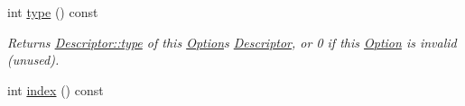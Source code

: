 \begin{DoxyCompactItemize}
\item 
int \hyperlink{classxmem_1_1config_1_1third__party_1_1_option_a4d80ee182577f0dacfbd617cfd714833}{type} () const 
\begin{DoxyCompactList}\small\item\em Returns \hyperlink{structxmem_1_1config_1_1third__party_1_1_descriptor_a4b9e9a5c9b08ef575ea4f603c54bff63}{Descriptor\+::type} of this \hyperlink{classxmem_1_1config_1_1third__party_1_1_option}{Option}\textquotesingle{}s \hyperlink{structxmem_1_1config_1_1third__party_1_1_descriptor}{Descriptor}, or 0 if this \hyperlink{classxmem_1_1config_1_1third__party_1_1_option}{Option} is invalid (unused). \end{DoxyCompactList}\item 
\hypertarget{classxmem_1_1config_1_1third__party_1_1_option_a7debc43bf253931503da7efd4bf478e9}{}int \hyperlink{classxmem_1_1config_1_1third__party_1_1_option_a7debc43bf253931503da7efd4bf478e9}{index} () const \label{classxmem_1_1config_1_1third__party_1_1_option_a7debc43bf253931503da7efd4bf478e9}


\end{DoxyCompactItemize}
